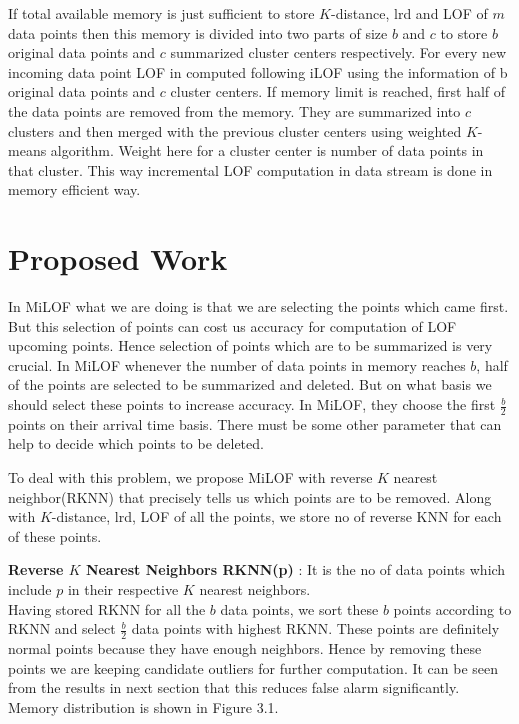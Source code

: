 \par If total available memory is just sufficient to store $K$-distance, lrd and LOF of $m$ data points then this memory is divided into two parts of size $b$ and $c$ to store $b$ original data points and $c$ summarized cluster centers respectively. For every new incoming data point LOF in computed following iLOF using the information of b$ $original data points and $c$ cluster centers. If memory limit is reached, first half of the data points are removed from the memory. They are summarized into $c$ clusters and then merged with the previous cluster centers using weighted $K$-means algorithm. Weight here for a cluster center is number of data points in that cluster. This way incremental LOF computation in data stream is done in memory efficient way.






 \section{Proposed Work}
 In MiLOF what we are doing is that we are selecting the points which came first. But this selection of points can cost us accuracy for computation of LOF  upcoming points. Hence selection of points which are to be summarized is very crucial. In MiLOF whenever the number of data points in memory reaches $b$, half of the points are selected to be summarized and deleted. But on what basis we should select these points to increase accuracy. In MiLOF, they choose the first $\frac{b}{2}$ points on their arrival time basis. There must be some other parameter that can help to decide which points to be deleted.

To deal with this problem, we propose MiLOF with reverse $K$ nearest neighbor(RKNN) that precisely tells us which points are to be removed. Along with $K$-distance, lrd, LOF of all the points, we store no of reverse KNN for each of these points. \\

\par 
\textbf{Reverse $K$ Nearest Neighbors RKNN(p) } : It is the no of data points which include $p$ in their respective $K$ nearest neighbors.\\

Having stored RKNN for all the $b$ data points, we sort these $b$ points according to RKNN and select $\frac{b}{2}$ data points with highest RKNN. These points are definitely normal points because they have enough neighbors. Hence by removing these points we are keeping candidate outliers for further computation. It can be seen from the results in next section that this reduces false alarm significantly.
Memory distribution is shown in Figure 3.1.


